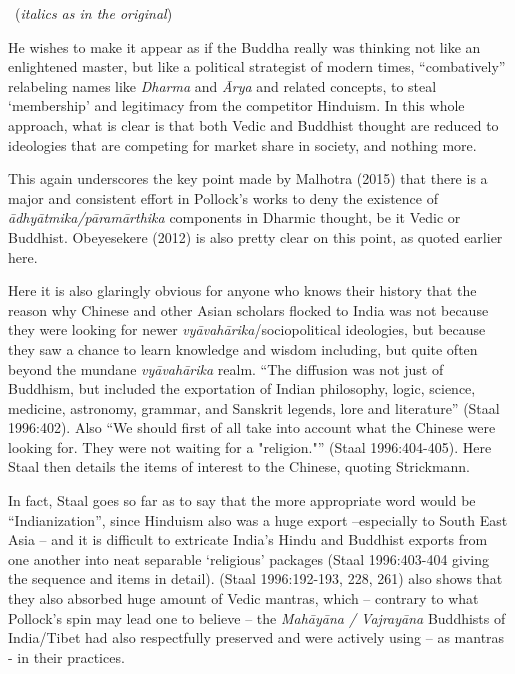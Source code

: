\begin{myquote}

~\hfill (\textit{italics as in the original})
\end{myquote}

He wishes to make it appear as if the Buddha really was thinking not like an enlightened master, but like a political strategist of modern times, “combatively” relabeling names like \textit{Dharma} and \textit{Ārya} and related concepts, to steal ‘membership’ and legitimacy from the competitor Hinduism. In this whole approach, what is clear is that both Vedic and Buddhist thought are reduced to ideologies that are competing for market share in society, and nothing more.

This again underscores the key point made by Malhotra (2015) that there is a major and consistent effort in Pollock’s works to deny the existence of \textit{ādhyātmika/pāramārthika} components in Dharmic thought, be it Vedic or Buddhist. Obeyesekere (2012) is also pretty clear on this point, as quoted earlier here.

Here it is also glaringly obvious for anyone who knows their history that the reason why Chinese and other Asian scholars flocked to India was not because they were looking for newer \textit{vyāvahārika}/sociopolitical ideologies, but because they saw a chance to learn knowledge and wisdom including, but quite often beyond the mundane \textit{vyāvahārika} realm. “The diffusion was not just of Buddhism, but included the exportation of Indian philosophy, logic, science, medicine, astronomy, grammar, and Sanskrit legends, lore and literature” (Staal 1996:402). Also “We should first of all take into account what the Chinese were looking for. They were not waiting for a "religion."” (Staal 1996:404-405). Here Staal then details the items of interest to the Chinese, quoting Strickmann.

In fact, Staal goes so far as to say that the more appropriate word would be “Indianization”, since Hinduism also was a huge export –especially to South East Asia – and it is difficult to extricate India’s Hindu and Buddhist exports from one another into neat separable ‘religious’ packages (Staal 1996:403-404 giving the sequence and items in detail). (Staal 1996:192-193, 228, 261) also shows that they also absorbed huge amount of Vedic mantras, which – contrary to what Pollock’s spin may lead one to believe – the \textit{Mahāyāna / Vajrayāna} Buddhists of India/Tibet had also respectfully preserved and were actively using – as mantras - in their practices.

